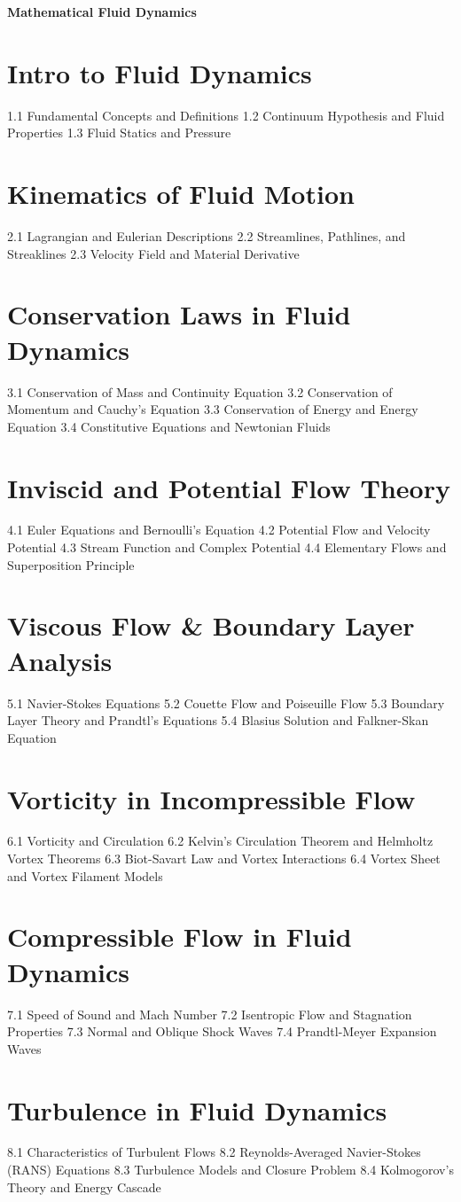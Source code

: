 {\LARGE \bf{Mathematical Fluid Dynamics}}
\section{Intro to Fluid Dynamics}
1.1 Fundamental Concepts and Definitions
1.2 Continuum Hypothesis and Fluid Properties
1.3 Fluid Statics and Pressure
\section{Kinematics of Fluid Motion}
2.1 Lagrangian and Eulerian Descriptions
2.2 Streamlines, Pathlines, and Streaklines
2.3 Velocity Field and Material Derivative
\section{Conservation Laws in Fluid Dynamics}
3.1 Conservation of Mass and Continuity Equation
3.2 Conservation of Momentum and Cauchy's Equation
3.3 Conservation of Energy and Energy Equation
3.4 Constitutive Equations and Newtonian Fluids
\section{Inviscid and Potential Flow Theory}
4.1 Euler Equations and Bernoulli's Equation
4.2 Potential Flow and Velocity Potential
4.3 Stream Function and Complex Potential
4.4 Elementary Flows and Superposition Principle
\section{Viscous Flow \& Boundary Layer Analysis}
5.1 Navier-Stokes Equations
5.2 Couette Flow and Poiseuille Flow
5.3 Boundary Layer Theory and Prandtl's Equations
5.4 Blasius Solution and Falkner-Skan Equation
\section{Vorticity in Incompressible Flow}
6.1 Vorticity and Circulation
6.2 Kelvin's Circulation Theorem and Helmholtz Vortex Theorems
6.3 Biot-Savart Law and Vortex Interactions
6.4 Vortex Sheet and Vortex Filament Models
\section{Compressible Flow in Fluid Dynamics}
7.1 Speed of Sound and Mach Number
7.2 Isentropic Flow and Stagnation Properties
7.3 Normal and Oblique Shock Waves
7.4 Prandtl-Meyer Expansion Waves
\section{Turbulence in Fluid Dynamics}
8.1 Characteristics of Turbulent Flows
8.2 Reynolds-Averaged Navier-Stokes (RANS) Equations
8.3 Turbulence Models and Closure Problem
8.4 Kolmogorov's Theory and Energy Cascade
